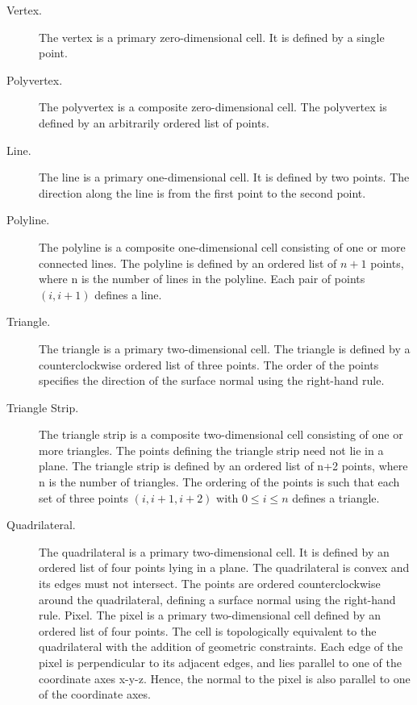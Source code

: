 \begin{description}

\item[Vertex.] The vertex is a primary zero-dimensional cell. It is defined by a single point.

\item[Polyvertex.] The polyvertex is a composite zero-dimensional cell. The polyvertex is defined by an arbitrarily ordered list of points.

\item[Line.] The line is a primary one-dimensional cell. It is defined by two points. The direction along the line is from the first point to the second point.

\item[Polyline.] The polyline is a composite one-dimensional cell consisting of one or more connected lines. The polyline is defined by an ordered list of $n+1$ points, where n is the number of lines in the polyline. Each pair of points $(i, i+1)$ defines a line.

\item[Triangle.] The triangle is a primary two-dimensional cell. The triangle is defined by a counterclockwise ordered list of three points. The order of the points specifies the direction of the surface normal using the right-hand rule.

\item[Triangle Strip.] The triangle strip is a composite two-dimensional cell consisting of one or more triangles. The points defining the triangle strip need not lie in a plane. The triangle strip is defined by an ordered list of n+2 points, where n is the number of triangles. The ordering of the points is such that each set of three points $(i,i+1,i+2)$ with $0 \leq i \leq n$ defines a triangle.

\item[Quadrilateral.] The quadrilateral is a primary two-dimensional cell. It is defined by an ordered list of four points lying in a plane. The quadrilateral is convex and its edges must not intersect. The points are ordered counterclockwise around the quadrilateral, defining a surface normal using the right-hand rule. Pixel. The pixel is a primary two-dimensional cell defined by an ordered list of four points. The cell is topologically equivalent to the quadrilateral with the addition of geometric constraints. Each edge of the pixel is perpendicular to its adjacent edges, and lies parallel to one of the coordinate axes x-y-z. Hence, the normal to the pixel is also parallel to one of the coordinate axes.


\end{description}
